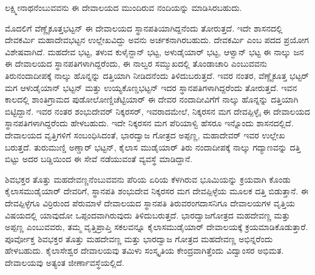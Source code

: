 ಲಕ್ಷ್ಮೀನಾಥನೆಂಬುವವನು ಈ ದೇವಾಲಯದ ಮುಂದಿರುವ ನಂದಿಯನ್ನು ಮಾಡಿಸಿರಬಹುದು.

ಮೊದಲಿಗೆ ವೆಣ್ಣೈಕೂತ್ತಭಟ್ಟನ್​ ಈ ದೇವಾಲಯದ ಸ್ಥಾನಪತಿಯಾಗಿದ್ದನೆಂದು ತೋರುತ್ತದೆ. ಇದೇ ಶಾಸನದಲ್ಲಿ ದೇವಕರ್ಮಿ ಮಹಾದೇವಭಟ್ಟನ ಉಲ್ಲೇಖವಿದ್ದು ಅವನು ಅರ್ಚಕನಾಗಿರಬಹುದು. ದೇವಕರ್ಮಿ ಎಂಬ ಪದದ ಪ್ರಯೋಗ ವಿಶೇಷವಾಗಿದೆ. ಮಹದೇವ ಭಟ್ಟ, ತಳುವ ಕುಳೈನ್ದಾನ್​ ಭಟ್ಟ, ಅಳುಡೈಯಾರ್​ ಭಟ್ಟ, ಆಳ್ವಾನ್​ ಭಟ್ಟ ಈ ನಾಲ್ಕು ಜನ ಈ ದೇವಾಲಯದ ಸ್ಥಾನಪತಿಗಳಾಗಿದ್ದರೆಂದು, ಈ ನಾಲ್ವರ ಸಮ್ಮುಖದಲ್ಲಿ ತೊಂಡಾಚಾರಿ ಎಂಬುವವನು ತಿರುನಂದಾದೀಪಕ್ಕೆ ನಾಲ್ಕು ಹೊನ್ನನ್ನು ದತ್ತಿಯಾಗಿ ನೀಡಿದನೆಂದು ತಿಳಿದುಬರುತ್ತದೆ. ಇವರ ನಂತರ, ವೆಣ್ಣೈಕೂತ್ತ ಭಟ್ಟರ್​ ಮಗ ಆಳುಡೈಯಾನ್​ ಭಟ್ಟನ್​ ಮತ್ತು ಉಯ್ಯಕೊಣ್ಡಭಟ್ಟನ್​ ಇದರ ಸ್ಥಾನಪತಿಗಳಾಗಿದ್ದರೆಂದು ತೋರುತ್ತದೆ. ಇವನ ಕಾಲದಲ್ಲಿ ಶಾಂತಿಗ್ರಾಮದ ಪುಡೋಲೋಣ್ಡಿಚೆಟ್ಟಿಯಾರ್​ ಈ ದೇವರ ನಂದಾದೀವಿಗೆಗೆ ನಾಲ್ಕು ಹೊನ್ನನ್ನು ದತ್ತಿಯಾಗಿ ಬಿಟ್ಟಿದ್ದಾನೆ. ಇವರ ನಂತರ ಶಂಭುದೇವರ್​ ನಿಕ್ಕರಸರ್​, ಇವರಾದಮೇಲೆ, ನಿಕ್ಕರಸನ ಮಗ ದೇವಪ್ಪಿಳ್ಳೈ ಈ ದೇವಾಲಯದ ಸ್ಥಾನಪತಿಗಳಾಗಿದ್ದರೆಂದು ಹೇಳಬಹುದು. ಇದೇ ನಿಕ್ಕರಸನ ಮಗ ಪೆರಿಯಾಳ್ವಿ ಹೆಸರೂ ಇನ್ನೊಂದು ಶಾಸನದಲ್ಲಿದೆ. ದೇವಾಲಯದ ವೃತ್ತಿಗಳಿಗೆ ಸಂಬಂಧಿಸಿದಂತೆ, ಭಾರದ್ವಾಜ ಗೋತ್ರದ ಅಪ್ಪಣ್ಣ, ಮಹಾದೇವರ್​ ಇವರ ಉಲ್ಲೇಖ ಬರುತ್ತದೆ. ತುರುಮುಣ್ಡಿ ಅಣ್ಡಾರ್​ ಭಟ್ಟನ್​, ಕೈಲಾಸ ಮುಡೈಯಾರ್​ ತಿರು ನಂದಾದೀಪಕ್ಕೆ ನಾಲ್ಕು ಗದ್ಯಾಣವನ್ನು ದತ್ತಿ ಬಿಟ್ಟು ಅದರ ಬಡ್ಡಿಯಿಂದ ಈ ಸೇವೆ ನಡೆಯುವಂತೆ ವ್ಯವಸ್ಥೆ ಮಾಡಿದ್ದಾನೆ.

ಶಿವಭಕ್ತರ ತೊತ್ತು ಮಹದೇವಣ್ಣನೆಂಬುವವನು ಪೆರಿಯ ಏರಿಯ ಕೆಳಗಿರುವ ಭೂಮಿಯನ್ನು ಕ್ರಯವಾಗಿ ಕೊಂಡು ಕೈಲಾಸಮುಡೈಯಾರ್​ ದೇವರಿಗೆ, ಸ್ಥಾನಪತಿ ಶಂಭುದೇವ ನಿಕ್ಕರಸರ ಮಗ ದೇವಪ್ಪಿಳ್ಳೆಯ ಮೂಲಕ ದತ್ತಿ ಬಿಡುತ್ತಾನೆ. ಈ ದೇವಪ್ಪಿಳ್ಳೆಗೂ ವಿರ್ರಿರುಂದ ಪೆರುಮಾಳೆ ದೇವಾಲಯದ ಸ್ಥಾನಪತಿ ತಿರುವರಂಗದಾಸನಿಗೂ ದೇವಾಲಯಗಳ ವೃತ್ತಿಯ ವಿಷಯದಲ್ಲಿ ಯಾವುದೋ ಒಪ್ಪಂದವಾಗಿರುವುದು ತಿಳಿದುಬರುತ್ತದೆ. ಭಾರದ್ವಾಜಗೋತ್ರದ ಮಹದೇವಣ್ಣ ಮತ್ತು ಅಪ್ಪಣ್ಣ ಎಂಬುವವರು, ತಮ್ಮ ವೃತ್ತಿಪ್ರಾಪ್ತಿ ಸಕಲವನ್ನೂ ಕೈಲಾಸಮುಡೈಯಾರ್​ ದೇವಾಲಯಕ್ಕೆ ಕ್ರಯಮಾಡಿಕೊಡುತ್ತಾರೆ. ಪೂರ್ವೋಕ್ತ ಶಿವಭಕ್ತರ ತೊತ್ತು ಮಹದೇವಣ್ಣ ಮತ್ತು ಭಾರದ್ವಾಜ ಗೋತ್ರದ ಮಹದೇವಣ್ಣ ಅಭಿನ್ನರೆಂದು ಹೇಳಬಹುದು. ಕೈಲಾಸೇಶ್ವರ ದೇವಾಲಯವು ತಮಿಳು ಸಂಸ್ಕೃತಿಯ ಕೇಂದ್ರವಾಗಿತ್ತೆಂದು ವಿದ್ವಾಂಸರ ಅಭಿಮತ. ದೇವಾಲಯವು ಅತ್ಯಂತ ಜೀರ್ಣಾವಸ್ಥೆಯಲ್ಲಿದೆ.

